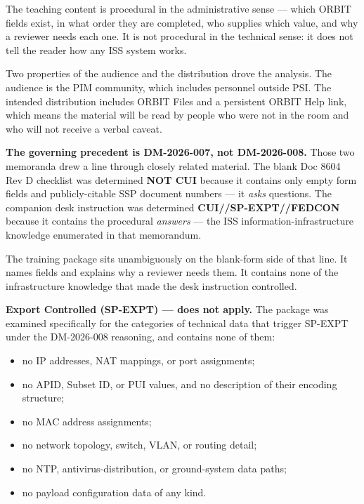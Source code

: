 {\begin{enumerate}
The teaching content is procedural in the administrative sense --- which ORBIT fields exist, in what order they are completed, who supplies which value, and why a reviewer needs each one. It is not procedural in the technical sense: it does not tell the reader how any ISS system works.

Two properties of the audience and the distribution drove the analysis. The audience is the PIM community, which includes personnel outside PSI. The intended distribution includes ORBIT Files and a persistent ORBIT Help link, which means the material will be read by people who were not in the room and who will not receive a verbal caveat.


\textbf{The governing precedent is DM-2026-007, not DM-2026-008.} Those two memoranda drew a line through closely related material. The blank Doc 8604 Rev D checklist was determined \textbf{NOT CUI} because it contains only empty form fields and publicly-citable SSP document numbers --- it \textit{asks} questions. The companion desk instruction was determined \textbf{CUI//SP-EXPT//FEDCON} because it contains the procedural \textit{answers} --- the ISS information-infrastructure knowledge enumerated in that memorandum.

The training package sits unambiguously on the blank-form side of that line. It names fields and explains why a reviewer needs them. It contains none of the infrastructure knowledge that made the desk instruction controlled.

\textbf{Export Controlled (SP-EXPT) --- does not apply.} The package was examined specifically for the categories of technical data that trigger SP-EXPT under the DM-2026-008 reasoning, and contains none of them:

\begin{itemize}
    \item no IP addresses, NAT mappings, or port assignments;
    \item no APID, Subset ID, or PUI values, and no description of their encoding structure;
    \item no MAC address assignments;
    \item no network topology, switch, VLAN, or routing detail;
    \item no NTP, antivirus-distribution, or ground-system data paths;
    \item no payload configuration data of any kind.
\end{itemize}


\end{enumerate}}
